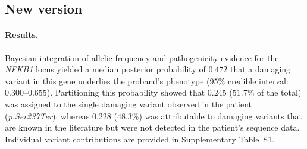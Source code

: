 \begin{table}[ht]
\centering
\caption{Final Variant Results for Patient (XL LOF)}
\label{tab:final_variant_report}
\end{table}




\subsection{New version}



\paragraph{Results.}
Bayesian integration of allelic frequency and pathogenicity evidence for the \textit{NFKB1} locus yielded a median posterior probability of $0.472$ that a damaging variant in this gene underlies the proband’s phenotype (95\% credible interval: $0.300$–$0.655$).  Partitioning this probability showed that $0.245$ ($51.7\%$ of the total) was assigned to the single damaging variant observed in the patient (\textit{p.Ser237Ter}), whereas $0.228$ ($48.3\%$) was attributable to damaging variants that are known in the literature but were not detected in the patient’s sequence data.  Individual variant contributions are provided in Supplementary Table~S1.

